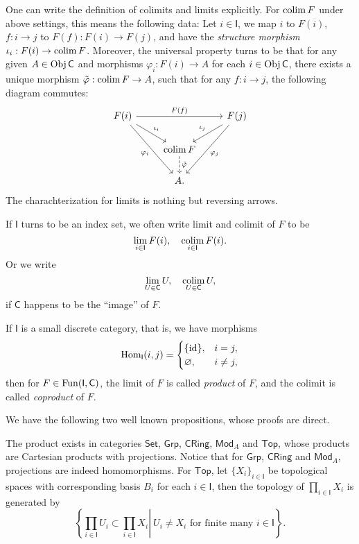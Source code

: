 \begin{rem}
    One can write the definition of colimits and limits explicitly.
    For $\operatorname*{colim}{F}$ under above settings, this means the following data:
    Let $i\in\mathsf{I}$, we map $i$ to $F(i)$, $f:i\to j$ to $F(f):F(i)\to F(j)$, and have the \emph{structure morphism} $\iota_i:F(i)\to\operatorname*{colim}{F}$.
    Moreover, the universal property turns to be that for any given $A\in\operatorname{Obj}\mathsf{C}$ and morphisms $\varphi_i:F(i)\to A$ for each $i\in\operatorname{Obj}\mathsf{C}$, there exists a unique morphism $\tilde\varphi:\operatorname*{colim}{F}\to A$, such that for any $f:i\to j$, the following diagram commutes:
    \[\begin{tikzcd}
        F(i) \ar[rr, "{F(f)}"] \ar[rd, "{\iota_i}"] \ar[rdd, "{\varphi_i}"'] & \ & F(j) \ar[ld, "{\iota_j}"'] \ar[ldd, "{\varphi_j}"] \\
        \ & \colim{F} \ar[d, dashed, "{\tilde\varphi}"] & \ \\
        \ & A. & \
    \end{tikzcd}\]
    The charachterization for limits is nothing but reversing arrows.
\end{rem}

\begin{nota}
    If $\mathsf{I}$ turns to be an index set, we often write limit and colimit of $F$ to be
    \[\lim_{i\in\mathsf{I}}F(i),\quad\operatorname*{colim}_{i\in\mathsf{I}}F(i).\]
    Or we write
    \[\lim_{U\in\mathsf{C}}U,\quad\operatorname*{colim}_{U\in\mathsf{C}}U,\]
    if $\mathsf{C}$ happens to be the ``image'' of $F$.
\end{nota}

\begin{defn}
    If $\mathsf{I}$ is a small discrete category, that is, we have morphisms
    \[\operatorname{Hom}_\mathsf{I}(i,j)=\begin{cases}
        \{\mathrm{id}\}, & i=j,\\
        \varnothing, & i\neq j,
    \end{cases}\]
    then for $F\in\operatorname{Fun}(\mathsf{I},\mathsf{C})$, the limit of $F$ is called \emph{product} of $F$, and the colimit is called \emph{coproduct} of $F$.
\end{defn}

We have the following two well known propositions, whose proofs are direct.
\begin{prop}
    The product exists in categories $\mathsf{Set}$, $\mathsf{Grp}$, $\mathsf{CRing}$, $\mathsf{Mod}_A$ and $\mathsf{Top}$, whose products are Cartesian products with projections.
    Notice that for $\mathsf{Grp}$, $\mathsf{CRing}$ and $\mathsf{Mod}_A$, projections are indeed homomorphisms.
    For $\mathsf{Top}$, let $\{X_i\}_{i\in\mathsf{I}}$ be topological spaces with corresponding basis $B_i$ for each $i\in\mathsf{I}$, then the topology of $\prod_{i\in\mathsf{I}}X_i$ is generated by
    \[\left\{\left.\prod_{i\in\mathsf{I}}U_i\subset\prod_{i\in\mathsf{I}}X_i\right|\ U_i\neq X_i\text{ for finite many }i\in\mathsf{I}\right\}.\]
\end{prop}

